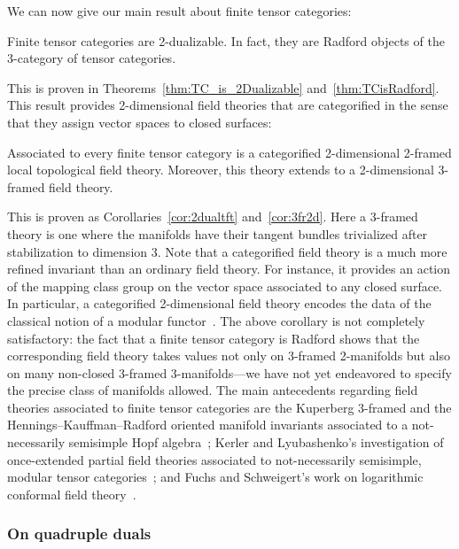 \documentclass{amsart}
\begin{document}
We can now give our main result about finite tensor categories:
\begin{maintheorem} \label{thm4}
Finite tensor categories are 2-dualizable.  In fact, they are Radford objects of the 3-category of tensor categories.
\end{maintheorem}
\nid This is proven in Theorems~\ref{thm:TC_is_2Dualizable} and~\ref{thm:TCisRadford}.  This result provides 2-dimensional field theories that are categorified in the sense that they assign vector spaces to closed surfaces:
\begin{maincor} \label{cor5}
Associated to every finite tensor category is a categorified 2-dimensional 2-framed local topological field theory.  Moreover, this theory extends to a 2-dimensional 3-framed field theory.
\end{maincor}
\nid This is proven as Corollaries~\ref{cor:2dualtft} and~\ref{cor:3fr2d}.  Here a 3-framed theory is one where the manifolds have their tangent bundles trivialized after stabilization to dimension 3.  Note that a categorified field theory is a much more refined invariant than an ordinary field theory.  For instance, it provides an action of the mapping class group on the vector space associated to any closed surface.  In particular, a categorified 2-dimensional field theory encodes the data of the classical notion of a modular functor~\cite{Segal, MR1159969,MR1797619}.  The above corollary is not completely satisfactory: the fact that a finite tensor category is Radford shows that the corresponding field theory takes values not only on 3-framed 2-manifolds but also on many non-closed 3-framed 3-manifolds---we have not yet endeavored to specify the precise class of manifolds allowed.  The main antecedents regarding field theories associated to finite tensor categories are the Kuperberg 3-framed and the Hennings--Kauffman--Radford oriented manifold invariants associated to a not-necessarily semisimple Hopf algebra~\cite{MR1394749,hennings,kauffrad}; Kerler and Lyubashenko's investigation of once-extended partial field theories associated to not-necessarily semisimple, modular tensor categories~\cite{MR1862634}; and Fuchs and Schweigert's work on logarithmic conformal field theory~\cite{fuchsschweigert}.


\subsubsection{On quadruple duals}
\end{document}
